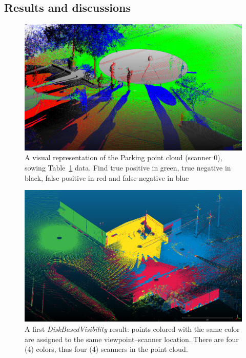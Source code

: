 \subsection{Results and discussions}
\begin{figure}
  \centering
  \includegraphics[scale=0.3]{img/positive-negative.png}
  \caption{A visual representation of the Parking point cloud (scanner 0), sowing Table~\ref{fig:positive-negative} data. Find true positive in green, true negative in black, false positive in red and false negative in blue}
  \label{fig:positive-negative}
\end{figure}
\begin{figure}
  \centering
  \includegraphics[scale=0.35]{img/custom-result1.png}
  \caption{A first \emph{DiskBasedVisibility} result: points colored with the same color are assigned to the same viewpoint--scanner location. There are four (4) colors, thus four (4) scanners in the point cloud.}
  \label{fig:custom-result1}
\end{figure}
